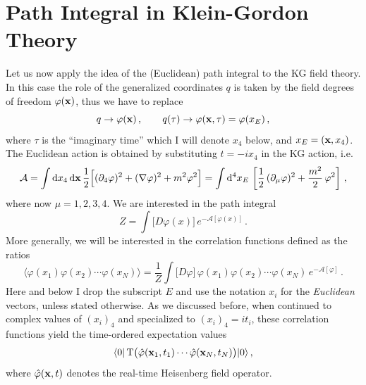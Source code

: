 \section{Path Integral in Klein-Gordon Theory}

Let us now apply the idea of the (Euclidean) path integral to the KG field
theory. In this case the role of the generalized coordinates $q$ is taken by
the field degrees of freedom $\varphi(\mathbf{x})$, thus we have to replace
\[
q\to\varphi(\mathbf{x})\,,\qquad q(\tau)\to\varphi(\mathbf{x},\tau)=\varphi(x_E)\,,
\]
where $\tau$ is the ``imaginary time'' which I will denote $x_4$ below, and
$x_E=(\mathbf{x},x_4)$. The Euclidean action is obtained by substituting $t=-ix_4$ in
the KG action, i.e.
\[
\mathcal A=\int \mathop{}\!\mathrm{d} x_4\mathop{}\!\mathrm{d}\mathbf{x}\,\frac12\Bigl[(\partial_4\varphi)^2+(\nabla\varphi)^2+m^2\varphi^2\Bigr]
=\int \mathop{}\!\mathrm{d}^4x_E\,\left[\frac12\,(\partial_\mu\varphi)^2+\frac{m^2}{2}\,\varphi^2\right]\,,
\]
where now $\mu=1,2,3,4$. We are interested in the path integral
\[
Z=\int\bigl[D\varphi(x)\bigr]\,e^{-\mathcal A[\varphi(x)]}\,.
\]
More generally, we will be interested in the correlation functions defined as
the ratios
\begin{equation}\label{eq:corrdef}
\bigl\langle\varphi(x_1)\varphi(x_2)\cdots\varphi(x_N)\bigr\rangle
=\frac1Z\int\bigl[D\varphi\bigr]\,\varphi(x_1)\varphi(x_2)\cdots\varphi(x_N)\,e^{-\mathcal A[\varphi]}\,.
\end{equation}
Here and below I drop the subscript $E$ and use the notation $x_i$ for the
\emph{Euclidean} vectors, unless stated otherwise. As we discussed before, when
continued to complex values of $(x_i)_4$ and specialized to $(x_i)_4=it_i$,
these correlation functions yield the time-ordered expectation values
\[
\langle 0|\operatorname{T}\bigl(\hat\varphi(\mathbf{x}_1,t_1)\cdots\hat\varphi(\mathbf{x}_N,t_N)\bigr)|0\rangle\,,
\]
where $\hat\varphi(\mathbf{x},t)$ denotes the real-time Heisenberg field operator.

